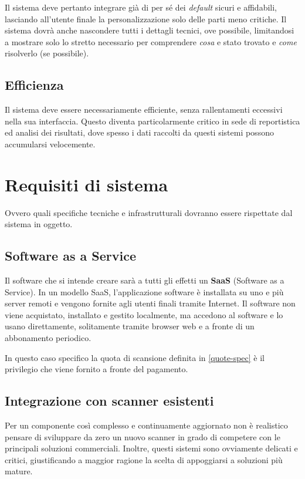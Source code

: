 Il sistema deve pertanto integrare già di per sé dei \emph{default} sicuri e affidabili, lasciando all'utente finale la personalizzazione solo delle parti meno critiche. Il sistema dovrà anche nascondere tutti i dettagli tecnici, ove possibile, limitandosi a mostrare solo lo stretto necessario per comprendere \emph{cosa} e stato trovato e \emph{come} risolverlo (se possibile).

\subsection{Efficienza}
Il sistema deve essere necessariamente efficiente, senza rallentamenti eccessivi nella sua interfaccia. Questo diventa particolarmente critico in sede di reportistica ed analisi dei risultati, dove spesso i dati raccolti da questi sistemi possono accumularsi velocemente.

\section{Requisiti di sistema}
Ovvero quali specifiche tecniche e infrastrutturali dovranno essere rispettate dal sistema in oggetto.

\subsection{Software as a Service}
\label{saas}
Il software che si intende creare sarà a tutti gli effetti un \textbf{SaaS} (Software as a Service). In un modello SaaS, l'applicazione software è installata su uno e più server remoti e vengono fornite agli utenti finali tramite Internet. Il software non viene acquistato, installato e gestito localmente, ma accedono al software e lo usano direttamente, solitamente tramite browser web e a fronte di un abbonamento periodico.

In questo caso specifico la quota di scansione definita in \ref{quote-spec} è il privilegio che viene fornito a fronte del pagamento.

\subsection{Integrazione con scanner esistenti}
Per un componente così complesso e continuamente aggiornato non è realistico pensare di sviluppare da zero un nuovo scanner in grado di competere con le principali soluzioni commerciali. Inoltre, questi sistemi sono ovviamente delicati e critici, giustificando a maggior ragione la scelta di appoggiarsi a soluzioni più mature.


